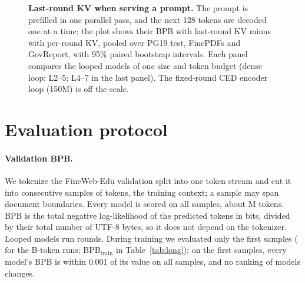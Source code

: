 \begin{figure}[t]
\centering
{}
\caption{\textbf{Last-round KV when serving a prompt.} The prompt is prefilled in one parallel pass, and the next
128 tokens are decoded one at a time; the plot shows their BPB with last-round KV minus with per-round KV, pooled
over PG19 test, FinePDFs and GovReport, with 95\% paired bootstrap intervals. Each panel compares the looped models
of one size and token budget (dense loop: L2--5; L4--7 in the last panel). The fixed-round CED encoder loop
(150M) is off the scale.}
\label{fig:kvprompt}
\end{figure}



\section{Evaluation protocol}
\label{app:eval}

\paragraph{Validation BPB.} We tokenize the FineWeb-Edu validation split into one token stream and cut it into
consecutive samples of  tokens, the training context; a sample may span document boundaries. Every
model is scored on all  samples, about M tokens. BPB is the total negative
log-likelihood of the predicted tokens in bits, divided by their total number of UTF-8 bytes, so it does not depend
on the tokenizer. Looped models run  rounds. During training we evaluated only the first
 samples ( for the B-token runs; BPB$_{\text{train}}$ in
Table~\ref{tab:long}); on the first  samples, every model's BPB is within 0.001 of its value on
all samples, and no ranking of models changes.

